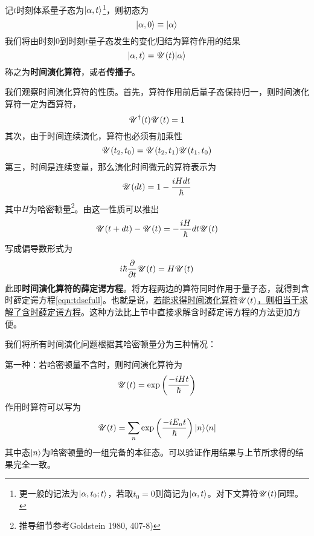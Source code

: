 记$ t $时刻体系量子态为$ |\alpha,t\rangle $\footnote{更一般的记法为$ |\alpha,t_0;t\rangle $，若取$ t_0=0 $则简记为$ |\alpha,t\rangle $。对下文算符$ \mathscr{U}(t) $同理。}，则初态为
\begin{equation}\label{key}
|\alpha,0\rangle\equiv|\alpha\rangle
\end{equation}
我们将由时刻0到时刻$ t $量子态发生的变化归结为算符作用的结果
\begin{equation}\label{ppg}
|\alpha,t\rangle=\mathscr{U}(t)|\alpha\rangle
\end{equation}
称之为\textbf{时间演化算符}，或者\textbf{传播子}。

我们观察时间演化算符的性质。首先，算符作用前后量子态保持归一，则时间演化算符一定为酉算符，
\begin{equation}\label{key}
\mathscr{U}^\dagger(t)\mathscr{U}(t)=1
\end{equation}
其次，由于时间连续演化，算符也必须有加乘性
\begin{equation}\label{key}
\mathscr{U}(t_2,t_0)=\mathscr{U}(t_2,t_1)\mathscr{U}(t_1,t_0)
\end{equation}
第三，时间是连续变量，那么演化时间微元的算符表示为
\begin{equation}\label{key}
\mathscr{U}(dt)=1-\dfrac{iHdt}{\hbar}
\end{equation}
其中$ H $为哈密顿量\footnote{推导细节参考Goldstein 1980, 407-8)}。由这一性质可以推出
\begin{equation}\label{key}
\mathscr{U}(t+dt)-\mathscr{U}(t)=-\dfrac{iH}{\hbar}dt\mathscr{U}(t)
\end{equation}
写成偏导数形式为
\begin{equation}\label{key}
i\hbar\dfrac{\partial}{\partial t}\mathscr{U}(t)=H\mathscr{U}(t)
\end{equation}
此即\textbf{时间演化算符的薛定谔方程}。将方程两边的算符同时作用于量子态，就得到含时薛定谔方程\eqref{eqn:tdsefull}。也就是说，\underline{若能求得时间演化算符$ \mathscr{U}(t) $，则相当于求解了含时薛定谔方程}。这种方法比上节中直接求解含时薛定谔方程的方法更加方便。

我们将所有时间演化问题根据其哈密顿量分为三种情况：

第一种：若哈密顿量不含时，则时间演化算符为
\begin{equation}\label{key}
\mathscr{U}(t)=\exp\left(\dfrac{-iHt}{\hbar}\right)
\end{equation}
作用时算符可以写为
\begin{equation}\label{eqn:1.2.9}
\mathscr{U}(t)=\sum_n\exp\left(\dfrac{-iE_nt}{\hbar}\right)|n\rangle\langle n|
\end{equation}
其中态$ |n\rangle $为哈密顿量的一组完备的本征态。可以验证作用结果与上节所求得的结果完全一致。

